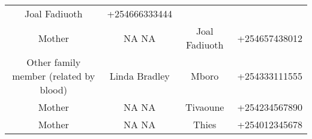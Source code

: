 \documentclass[
]{article}
\begin{document}
\begin{longtable}[]{@{}cccc@{}}
\begin{minipage}[t]{0.18\columnwidth}
Joal Fadiuoth\strut
\end{minipage} & \begin{minipage}[t]{0.18\columnwidth}\centering
+254666333444\strut
\end{minipage}\tabularnewline
\begin{minipage}[t]{0.35\columnwidth}\centering
Mother\strut
\end{minipage} & \begin{minipage}[t]{0.18\columnwidth}\centering
NA NA\strut
\end{minipage} & \begin{minipage}[t]{0.18\columnwidth}\centering
Joal Fadiuoth\strut
\end{minipage} & \begin{minipage}[t]{0.18\columnwidth}\centering
+254657438012\strut
\end{minipage}\tabularnewline
\begin{minipage}[t]{0.35\columnwidth}\centering
Other family member (related by blood)\strut
\end{minipage} & \begin{minipage}[t]{0.18\columnwidth}\centering
Linda Bradley\strut
\end{minipage} & \begin{minipage}[t]{0.18\columnwidth}\centering
Mboro\strut
\end{minipage} & \begin{minipage}[t]{0.18\columnwidth}\centering
+254333111555\strut
\end{minipage}\tabularnewline
\begin{minipage}[t]{0.35\columnwidth}\centering
Mother\strut
\end{minipage} & \begin{minipage}[t]{0.18\columnwidth}\centering
NA NA\strut
\end{minipage} & \begin{minipage}[t]{0.18\columnwidth}\centering
Tivaoune\strut
\end{minipage} & \begin{minipage}[t]{0.18\columnwidth}\centering
+254234567890\strut
\end{minipage}\tabularnewline
\begin{minipage}[t]{0.35\columnwidth}\centering
Mother\strut
\end{minipage} & \begin{minipage}[t]{0.18\columnwidth}\centering
NA NA\strut
\end{minipage} & \begin{minipage}[t]{0.18\columnwidth}\centering
Thies\strut
\end{minipage} & \begin{minipage}[t]{0.18\columnwidth}\centering
+254012345678\strut
\end{minipage}\tabularnewline
\bottomrule
\end{longtable}
\end{document}
